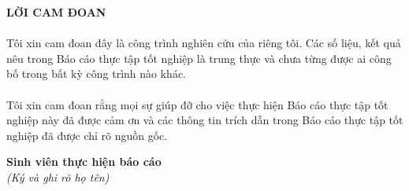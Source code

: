     \pagestyle{fancy}
	\fancyhf{}
	\chead{\thepage}
	\renewcommand{\headrulewidth}{0pt}
	\begin{center}
		\setcounter{page}{1}
		\fontsize{16}{20}\selectfont
		\textbf{LỜI CAM ĐOAN\\} 
	\end{center}
	\fontsize{13}{13}\selectfont
	\paragraph{}
	Tôi xin cam đoan đây là công trình nghiên cứu của riêng tôi. Các số liệu, kết quả nêu trong Báo cáo thực tập tốt nghiệp là trung thực và chưa từng được ai công bố trong bất kỳ công trình nào khác.
	\paragraph{}
    	Tôi xin cam đoan rằng mọi sự giúp đỡ cho việc thực hiện Báo cáo thực tập tốt nghiệp này 
    đã được cảm ơn và các thông tin trích dẫn trong Báo cáo thực tập tốt nghiệp đã được chỉ rõ nguồn gốc.
	
	\begin{flushright}
            \textbf {Sinh viên thực hiện báo cáo} \\
            \textit{(Ký và ghi rõ họ tên)}
        \end{flushright}
	\pagebreak	